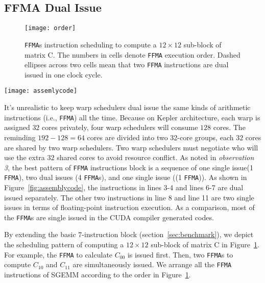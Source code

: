 \subsection{FFMA Dual Issue}

\begin{figure}[htbp]
\begin{center}
\texttt{[image: order]}
\caption{{\tt FFMA}s instruction scheduling to compute a $12\times 12$ sub-block of matrix C.  The numbers in
cells denote {\tt FFMA} execution order. Dashed ellipses across two cells mean that two {\tt FFMA} instructions are dual issued in one clock cycle.}
\label{fig:order}
\end{center}
\end{figure}

\begin{figure*}[htbp]
\begin{center}
\texttt{[image: assemlycode]}
    \caption{The comparison of compiler generated codes and our tuned assembly codes.}
\label{fig:assemblycode}
\end{center}
\end{figure*}

It's unrealistic to keep warp schedulers dual issue the same kinds of arithmetic instructions (i.e., {\tt FFMA}) all
the time. Because on Kepler architecture, each warp is assigned $32$ cores privately, four warp schedulers will consume
$128$ cores. The reminding $192-128=64$ cores are divided into two 32-core groups, each $32$ cores
are shared by two warp schedulers. Two warp schedulers must negotiate who will use the extra $32$ shared cores to avoid
resource conflict.
As noted in {\em observation 3}, the best pattern of {\tt FFMA} instructions block is a sequence of one single issue(1
{\tt FFMA}), two dual issues (4 {\tt FFMA}s), and one single issue ((1 {\tt FFMA})). As shown in
Figure~\ref{fig:assemblycode}, the instructions in lines 3-4 and lines 6-7 are dual issued separately.
The other two instructions in line 8 and line 11 are two single issues in terms of floating-point instruction
execution.
As a comparison, most of the {\tt FFMA}s are single issued in the CUDA compiler generated codes.

By extending the basic $7$-instruction block (section~\ref{sec:benchmark}), we depict the scheduling pattern of computing a $12\times 12$ sub-block of matrix C in Figure~\ref{fig:order}.
For example, the {\tt FFMA} to calculate $C_{00}$ is issued first.
Then, two {\tt FFMA}s to
compute $C_{10}$ and $C_{11}$ are simultaneously issued. We arrange all the {\tt FFMA} instructions of SGEMM according to the order in Figure~\ref{fig:order}.

